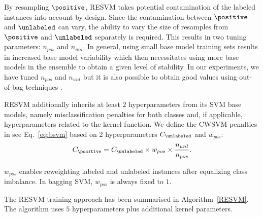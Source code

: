 By resampling $\positive$, RESVM takes potential contamination of the labeled instances into account by design. Since the contamination between $\positive$ and $\unlabeled$ can vary, the ability to vary the size of resamples from $\positive$ and $\unlabeled$ separately is required. This results in two tuning parameters: $n_{pos}$ and $n_{unl}$. In general, using small base model training sets results in increased base model variability which then necessitates using more base models in the ensemble to obtain a given level of stability. In our experiments, we have tuned $n_{pos}$ and $n_{unl}$ but it is also possible to obtain good values using out-of-bag techniques \citep{martinez2010out}.

RESVM additionally inherits at least $2$ hyperparameters from its SVM base models, namely misclassification penalties for both classes and, if applicable, hyperparameters related to the kernel function. We define the CWSVM penalties in see Eq.~\eqref{eq:bsvm} based on $2$ hyperparameters $C_{\unlabeled}$ and $w_{pos}$:
\begin{equation}
C_{\positive} = C_{\unlabeled} \times w_{pos} \times \frac{n_{unl}}{n_{pos}}. \label{eq:resvmpenalties}
\end{equation}

$w_{pos}$ enables reweighting labeled and unlabeled instances after equalizing class imbalance. In bagging SVM, $w_{pos}$ is always fixed to $1$. 

\newpage
The RESVM training approach has been summarised in Algorithm~\ref{RESVM}. The algorithm uses $5$ hyperparameters plus additional kernel parameters.

\newlength\mydatalen
\newcommand\mydata[1]{%
  \settowidth\mydatalen{\KwData{}}%
  \setlength\hangindent{\mydatalen}%
  \hspace*{\mydatalen}#1\\}

\newlength\myinputlen
\newcommand\myinput[1]{%
  \settowidth\myinputlen{\KwIn{}}%
  \setlength\hangindent{\myinputlen}%
  \hspace*{\myinputlen}#1\\}



